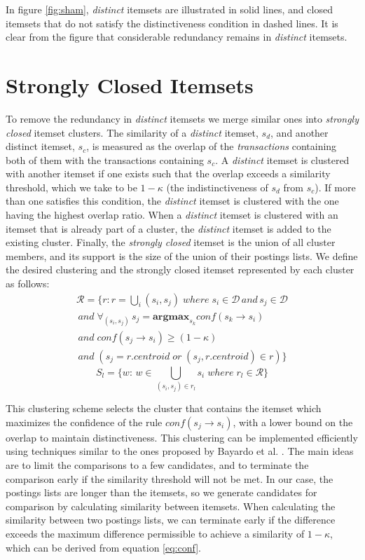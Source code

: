 \documentclass[letterpaper,12pt,titlepage,oneside,final]{book}
\begin{document}
In figure \ref{fig:sham}, \emph{distinct} itemsets are illustrated in solid
lines, and closed itemsets that do not satisfy the distinctiveness condition in dashed lines.
It is clear from the figure that considerable redundancy remains in
\emph{distinct} itemsets.

\section{Strongly Closed Itemsets}
To remove the redundancy in \emph{distinct} itemsets we merge similar ones
into \emph{strongly closed} itemset clusters.
The similarity of a \emph{distinct} itemset,
$s_d$, and another distinct itemset, $s_c$,
is measured as the overlap of the \emph{transactions} containing both of them
with the transactions containing $s_c$. 
A \emph{distinct} itemset is clustered with another itemset if one exists
such that the overlap exceeds a similarity threshold,
which we take to be $1-\kappa$ (the indistinctiveness of $s_d$ from $s_c$).
If more than one satisfies this condition,
the  \emph{distinct} itemset is clustered with the one having the highest
overlap ratio.
When  a \emph{distinct} itemset is clustered with an itemset that is already
part of a cluster, the \emph{distinct} itemset is added to the existing cluster.
Finally, the \emph{strongly closed} itemset is the union of all cluster members,
and its support is the size of the union of their postings lists.
We define the  desired clustering  and the strongly closed itemset
represented by each cluster as follows:
\begin{align*}\label{eq:strongClosedFormal}
\mathcal{R} = \{r: r = \bigcup_i{(s_i, s_j)}\; where\; s_i \in \mathcal{D} \, and \, s_j \in \mathcal{D} 
\\\,and\; \forall_{(s_i,s_j)} \, s_j = \textbf{argmax}_{s_k} conf(s_k \rightarrow s_i) \\\,and \;conf(s_j \rightarrow s_i) \ge (1-\kappa)
\\\, and\;( s_j = r.centroid\; or \; (s_j, r.centroid) \in r )\}
\end{align*}
\begin{equation}S_l = \{w:\, w \in \bigcup_{(s_i, s_j) \in r_l}{s_i} \; where \; r_l \in \mathcal{R}\}\end{equation}

This clustering scheme selects the cluster that contains the itemset which
maximizes the confidence of the rule $conf(s_j \rightarrow s_i)$,
with a lower bound on the overlap to maintain distinctiveness. 
This clustering can be implemented efficiently using techniques similar to
the ones proposed by Bayardo et al. \cite{bayardo2007scaling}.
The main ideas are to limit the comparisons to a few candidates,
and to terminate the comparison early if the similarity threshold will not
be met.
In our case, the postings lists are longer than the itemsets,
so we generate candidates for comparison by calculating similarity between
itemsets.
When calculating the similarity between two postings lists,
we can terminate early if the difference exceeds the maximum difference
permissible to achieve a similarity of $1-\kappa$,
which can be derived from equation \ref{eq:conf}. 
\end{document}
